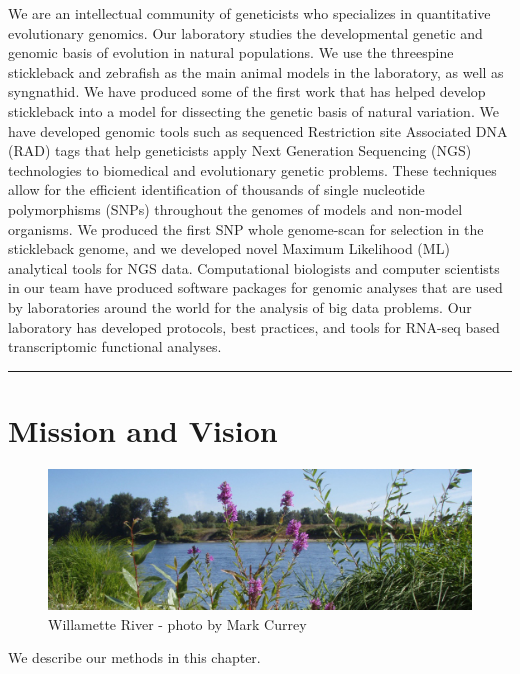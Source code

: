 \documentclass[
]{book}
\begin{document}
We are an intellectual community of geneticists who specializes in quantitative evolutionary genomics. Our laboratory studies the developmental genetic and genomic basis of evolution in natural populations. We use the threespine stickleback and zebrafish as the main animal models in the laboratory, as well as syngnathid. We have produced some of the first work that has helped develop stickleback into a model for dissecting the genetic basis of natural variation. We have developed genomic tools such as sequenced Restriction site Associated DNA (RAD) tags that help geneticists apply Next Generation Sequencing (NGS) technologies to biomedical and evolutionary genetic problems. These techniques allow for the efficient identification of thousands of single nucleotide polymorphisms (SNPs) throughout the genomes of models and non-model organisms. We produced the first SNP whole genome-scan for selection in the stickleback genome, and we developed novel Maximum Likelihood (ML) analytical tools for NGS data. Computational biologists and computer scientists in our team have produced software packages for genomic analyses that are used by laboratories around the world for the analysis of big data problems. Our laboratory has developed protocols, best practices, and tools for RNA-seq based transcriptomic functional analyses.

\begin{center}\rule{0.5\linewidth}{0.5pt}\end{center}

\hypertarget{mission-and-vision}{%
\chapter{Mission and Vision}\label{mission-and-vision}}

\begin{figure}
\centering
\includegraphics{images/willamette_header.jpg}
\caption{Willamette River - photo by Mark Currey}
\end{figure}

We describe our methods in this chapter.
\end{document}
